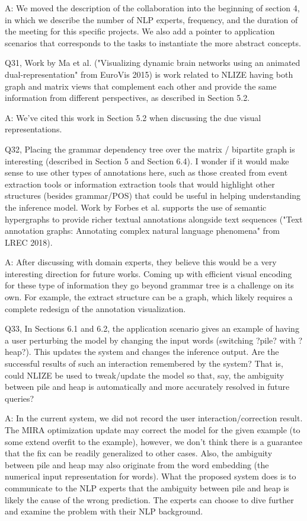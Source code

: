 A: We moved the description of the collaboration into the beginning of section 4, in which we describe the number of NLP experts, frequency, and the duration of the meeting for this specific projects. We also add a pointer to application scenarios that corresponds to the tasks to instantiate the more abstract concepts.

Q31, Work by Ma et al. ("Visualizing dynamic brain networks using an animated dual-representation" from EuroVis 2015) is work related to NLIZE having both graph and matrix views that complement each other and provide the same information from different perspectives, as described in Section 5.2.

A: We've cited this work in Section 5.2 when discussing the due visual representations.

Q32, Placing the grammar dependency tree over the matrix / bipartite graph is interesting (described in Section 5 and Section 6.4). I wonder if it would make sense to use other types of annotations here, such as those created from event extraction tools or information extraction tools that would highlight other structures (besides grammar/POS) that could be useful in helping understanding the inference model. Work by Forbes et al. supports the use of semantic hypergraphs to provide richer textual annotations alongside text sequences ("Text annotation graphs: Annotating complex natural language phenomena" from LREC 2018).

A: After discussing with domain experts, they believe this would be a very interesting direction for future works. Coming up with efficient visual encoding for these type of information they go beyond grammar tree is a challenge on its own. For example, the extract structure can be a graph, which likely requires a complete redesign of the annotation visualization.

Q33, In Sections 6.1 and 6.2, the application scenario gives an example of having a user perturbing the model by changing the input words (switching ?pile? with ?heap?). This updates the system and changes the inference output. Are the successful results of such an interaction remembered by the system? That is, could NLIZE be used to tweak/update the model so that, say, the ambiguity between pile and heap is automatically and more accurately resolved in future queries?

A: In the current system, we did not record the user interaction/correction result. The MIRA optimization update may correct the model for the given example (to some extend overfit to the example), however, we don't think there is a guarantee that the fix can be readily generalized to other cases. Also, the ambiguity between pile and heap may also originate from the word embedding (the numerical input representation for words). What the proposed system does is to communicate to the NLP experts that the ambiguity between pile and heap is likely the cause of the wrong prediction. The experts can choose to dive further and examine the problem with their NLP background.

